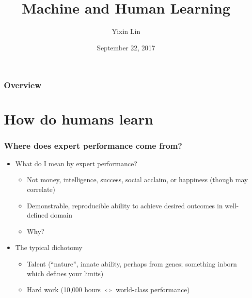 \documentclass{beamer}
\title[ML+HL]{Machine and Human Learning} %
\author{Yixin Lin} %
\institute[Duke University] %
{
Duke University \\ %
\medskip
\textit{yixin.lin@duke.edu} %
}
\date{September 22, 2017} %
\begin{document}
\begin{frame}
\titlepage %
\end{frame}

\begin{frame}
\frametitle{Overview} %
\tableofcontents %
\end{frame}


\section{How do humans learn}

\begin{frame}
  \frametitle{Where does expert performance come from?}
  \begin{itemize}
    \item What do I mean by expert performance?
      \begin{itemize}
        \item Not money, intelligence, success, social acclaim, or happiness (though may correlate)
        \item Demonstrable, reproducible ability to achieve desired outcomes in well-defined domain
	\item Why?
      \end{itemize}
    \item The typical dichotomy
      \begin{itemize}
        \item Talent (``nature'', innate ability, perhaps from genes; something inborn which defines your limits)
        \item Hard work (10,000 hours $\Leftrightarrow$ world-class performance)
      \end{itemize}
  \end{itemize}
\end{frame}
\end{document}
